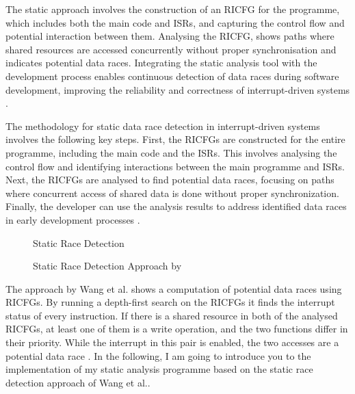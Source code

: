 \documentclass[
fancyheadings, %
%
%
]{stsreprt}
\begin{document}
{The static approach involves the construction of an RICFG for the programme, which includes both the main code and ISRs, and capturing the control flow and potential interaction between them. Analysing the RICFG, shows paths where shared resources are accessed concurrently without proper synchronisation and indicates potential data races. Integrating the static analysis tool with the development process enables continuous detection of data races during software development, improving the reliability and correctness of interrupt-driven systems \cite{wang2020}.

The methodology for static data race detection in interrupt-driven systems involves the following key steps. First, the RICFGs are constructed for the entire programme, including the main code and the ISRs. This involves analysing the control flow and identifying interactions between the main programme and ISRs. Next, the RICFGs are analysed to find potential data races, focusing on paths where concurrent access of shared data is done without proper synchronization. Finally, the developer can use the analysis results to address identified data races in early development processes \cite{wang2020}.

\begin{figure}[H]
	\begin{algorithm}[H]
		\caption{Static Race Detection}
		
		\BlankLine
	\end{algorithm}
	\caption{Static Race Detection Approach by \cite{wang2020}}
\end{figure}

The approach by Wang et al. shows a computation of potential data races using RICFGs. By running a depth-first search on the RICFGs it finds the interrupt status of every instruction. If there is a shared resource in both of the analysed RICFGs, at least one of them is a write operation, and the two functions differ in their priority. While the interrupt in this pair is enabled, the two accesses are a potential data race \cite{wang2020}.
In the following, I am going to introduce you to the implementation of my static analysis programme based on the static race detection approach of Wang et al..


}
\end{document}
